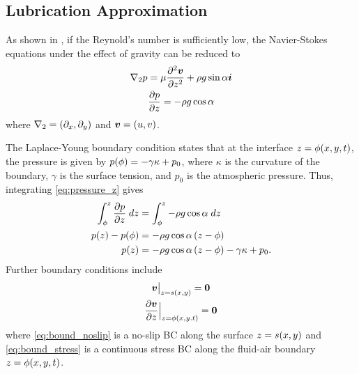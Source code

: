 \subsection{Lubrication Approximation}
As shown in \cite{kondic2003instabilities}, if the Reynold's number is sufficiently low, the Navier-Stokes equations under the effect of gravity can be reduced to 
\begin{gather}
    \nabla_2 p = \mu \frac{\partial^2 \boldsymbol{v}}{\partial z^2} + \rho g \sin\alpha \boldsymbol{i} 
    \label{eq:pressure_grad}\\
    \frac{\partial p}{\partial z} = -\rho g \cos \alpha
    \label{eq:pressure_z}
\end{gather}
where $\nabla_2 = \left( \partial_x, \partial_y \right)$ and $\boldsymbol{v} = \left( u, v \right)$.

The Laplace-Young boundary condition states that at the interface $z = \phi\!\left( x, y, t \right)$, the pressure is given by 
$p\!\left( \phi \right) = -\gamma \kappa + p_0$, where $\kappa$ is the curvature of the boundary, $\gamma$ is the surface tension, and $p_0$ is the atmospheric pressure. 
Thus, integrating \cref{eq:pressure_z} gives 
\begin{align}
    \nonumber \int_{\phi}^{z} \frac{\partial p}{\partial z} \; dz &=  \int_{\phi}^{z} -\rho g \cos \alpha \; dz\\
    \nonumber p\!\left( z \right) - p\!\left( \phi \right) &= -\rho g \cos \alpha \left( z - \phi \right)\\
    p\!\left( z \right) &= -\rho g \cos \alpha \left( z - \phi \right) -\gamma \kappa + p_0.  
    \label{eq:laplace_young}
\end{align}
Further boundary conditions include 
\begin{gather}
    \evalat{\vect{v}}{z = s\lrp{x,y}} = \vect{0} 
    \label{eq:bound_noslip}\\
    \evalat[\Big]{\pderiv{\vect{v}}{z}}{z = \phi\lrp{x,y. t}} = \vect{0} 
    \label{eq:bound_stress}
\end{gather}
where \cref{eq:bound_noslip} is a no-slip BC along the surface $z = s\!\left( x,y \right)$ and \cref{eq:bound_stress}
is a continuous stress BC along the fluid-air boundary $z = \phi\!\left( x,y, t \right)$. 

